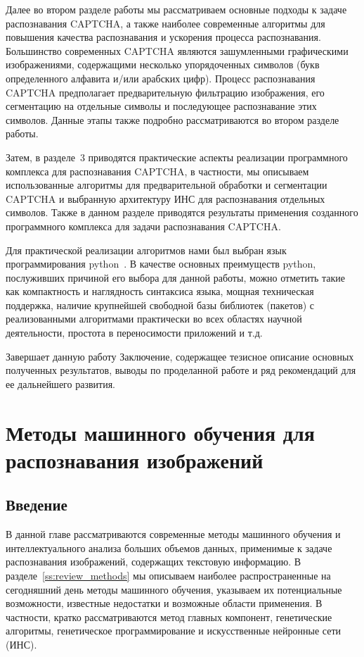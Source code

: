 \documentclass[a4paper,12pt,russian]{article} %
\begin{document}
Далее во втором разделе работы мы рассматриваем основные подходы к задаче распознавания CAPTCHA, а также наиболее современные алгоритмы для повышения качества распознавания и ускорения процесса распознавания.
Большинство современных CAPTCHA являются зашумленными графическими изображениями, содержащими несколько упорядоченных символов (букв определенного алфавита и/или арабских цифр).
Процесс распознавания CAPTCHA предполагает предварительную фильтрацию изображения, его сегментацию на отдельные символы и последующее распознавание этих символов.
Данные этапы также подробно рассматриваются во втором разделе работы.

Затем, в разделе~3 приводятся практические аспекты реализации программного комплекса для распознавания CAPTCHA, в частности, мы описываем использованные алгоритмы для предварительной обработки и сегментации CAPTCHA и выбранную архитектуру ИНС для распознавания отдельных символов.
Также в данном разделе приводятся результаты применения созданного программного комплекса для задачи распознавания CAPTCHA.

Для практической реализации алгоритмов нами был выбран язык программирования python~\cite{Python_van2011, Python_kuhlman2009, Python_ceder2010}.
В качестве основных преимуществ python, послуживших причиной его выбора для данной работы, можно отметить такие как компактность и наглядность синтаксиса языка, мощная техническая поддержка, наличие крупнейшей свободной базы библиотек (пакетов) с реализованными алгоритмами практически во всех областях научной деятельности, простота в переносимости приложений и т.д.

Завершает данную работу Заключение, содержащее тезисное описание основных полученных результатов, выводы по проделанной работе и ряд рекомендаций для ее дальнейшего развития.
		
\newpage
\section{Методы машинного обучения для распознавания изображений} \label{s:review}

\subsection{Введение} \label{ss:review_intro}

В данной главе рассматриваются современные методы машинного обучения и интеллектуального анализа больших объемов данных, применимые к задаче распознавания изображений, содержащих текстовую информацию.
В разделе~\ref{ss:review_methods} мы описываем наиболее распространенные на сегодняшний день методы машинного обучения, указываем их потенциальные возможности, известные недостатки и возможные области применения.
В частности, кратко рассматриваются метод главных компонент, генетические алгоритмы, генетическое программирование и искусственные нейронные сети (ИНС).
\end{document}
